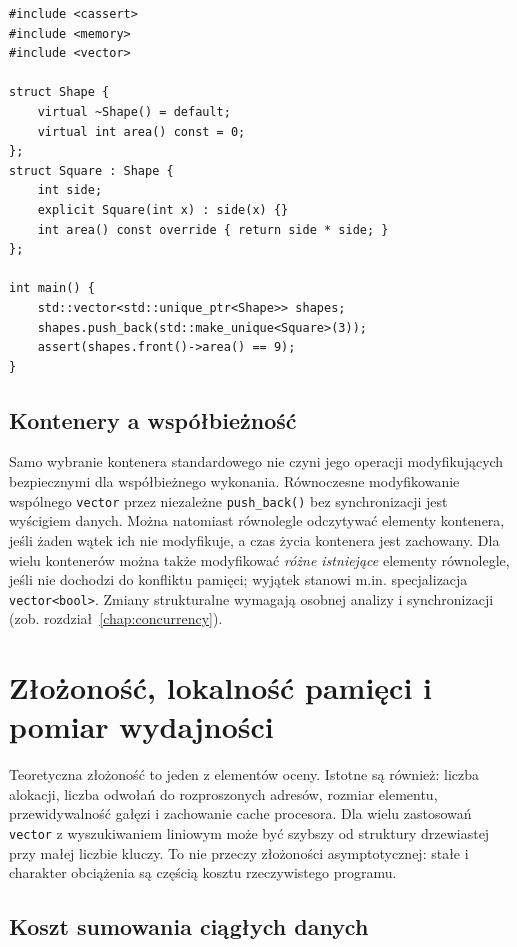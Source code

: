 \begin{lstlisting}[caption={Kontener wlasciwych obiektow polimorficznych (C++14); kompletny program.}]
#include <cassert>
#include <memory>
#include <vector>

struct Shape {
    virtual ~Shape() = default;
    virtual int area() const = 0;
};
struct Square : Shape {
    int side;
    explicit Square(int x) : side(x) {}
    int area() const override { return side * side; }
};

int main() {
    std::vector<std::unique_ptr<Shape>> shapes;
    shapes.push_back(std::make_unique<Square>(3));
    assert(shapes.front()->area() == 9);
}
\end{lstlisting}

\subsection{Kontenery a współbieżność}

Samo wybranie kontenera standardowego nie czyni jego operacji
modyfikujących bezpiecznymi dla współbieżnego wykonania. Równoczesne
modyfikowanie wspólnego \texttt{vector} przez niezależne
\texttt{push\_back()} bez synchronizacji jest wyścigiem danych.
Można natomiast równolegle odczytywać elementy kontenera, jeśli żaden
wątek ich nie modyfikuje, a czas życia kontenera jest zachowany.
Dla wielu kontenerów można także modyfikować \emph{różne istniejące}
elementy równolegle, jeśli nie dochodzi do konfliktu pamięci; wyjątek
stanowi m.in. specjalizacja \texttt{vector<bool>}. Zmiany strukturalne
wymagają osobnej analizy i synchronizacji (zob. rozdział~\ref{chap:concurrency}).

\section{Złożoność, lokalność pamięci i pomiar wydajności}
\label{sec:cpp13-performance}

Teoretyczna złożoność to jeden z elementów oceny. Istotne są również:
liczba alokacji, liczba odwołań do rozproszonych adresów, rozmiar
elementu, przewidywalność gałęzi i zachowanie cache procesora.
Dla wielu zastosowań \texttt{vector} z wyszukiwaniem liniowym
może być szybszy od struktury drzewiastej przy małej liczbie kluczy.
To nie przeczy złożoności asymptotycznej: stałe i charakter obciążenia
są częścią kosztu rzeczywistego programu.

\subsection{Koszt sumowania ciągłych danych}

